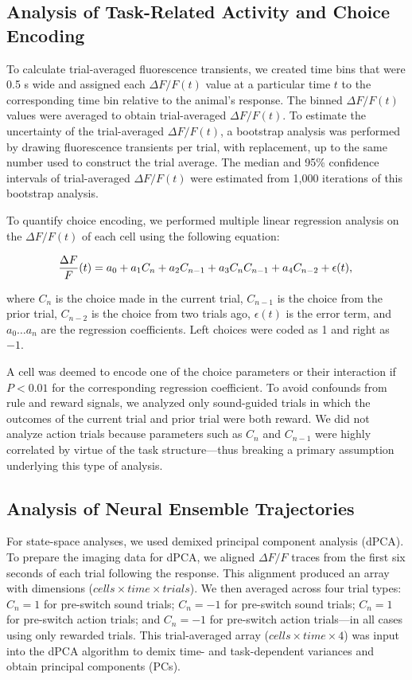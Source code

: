\subsection*{Analysis of Task-Related Activity and Choice Encoding}
To calculate trial-averaged fluorescence transients, we created time bins that were 0.5 s wide and assigned each $\Delta F/F (t)$ value at a particular time $t$ to the corresponding time bin relative to the animal's response. The binned $\Delta F/F (t)$ values were averaged to obtain trial-averaged $\Delta F/F (t)$. To estimate the uncertainty of the trial-averaged $\Delta F/F (t)$, a bootstrap analysis was performed by drawing fluorescence transients per trial, with replacement, up to the same number used to construct the trial average. The median and 95\% confidence intervals of trial-averaged $\Delta F/F (t)$ were estimated from 1,000 iterations of this bootstrap analysis. 

To quantify choice encoding, we performed multiple linear regression analysis on the $\Delta F/F (t)$ of each cell using the following equation:

\begin{equation*}
\frac{\Delta F}{F}(t) = a_0 + a_1 C_{n} + a_2 C_{n-1} + a_3 C_{n} C_{n-1} + a_4 C_{n-2} + \epsilon(t),\\
\end{equation*}

\noindent where $C_n$ is the choice made in the current trial, $C_{n-1}$ is the choice from the prior trial, $C_{n-2}$ is the choice from two trials ago, $\epsilon (t)$ is the error term, and $a_0 \ldots a_n$ are the regression coefficients. Left choices were coded as 1 and right as $-1$. 

A cell was deemed to encode one of the choice parameters or their interaction if $P < 0.01$ for the corresponding regression coefficient. To avoid confounds from rule and reward signals, we analyzed only sound-guided trials in which the outcomes of the current trial and prior trial were both reward. We did not analyze action trials because parameters such as $C_n$ and $C_{n-1}$ were highly correlated by virtue of the task structure---thus breaking a primary assumption underlying this type of analysis.

\subsection*{Analysis of Neural Ensemble Trajectories}
For state-space analyses, we used demixed principal component analysis \citep{machens2010functional} (dPCA). To prepare the imaging data for dPCA, we aligned $\Delta F/F$ traces from the first six seconds of each trial following the response. This alignment produced an array with dimensions ($cells \times time \times trials$). We then averaged across four trial types: $C_n = 1$ for pre-switch sound trials; $C_n = -1$ for pre-switch sound trials; $C_n = 1$ for pre-switch action trials; and $C_n = -1$ for pre-switch action trials---in all cases using only rewarded trials. This trial-averaged array ($cells \times time \times 4$) was input into the dPCA algorithm to demix time- and task-dependent variances and obtain principal components (PCs). 

